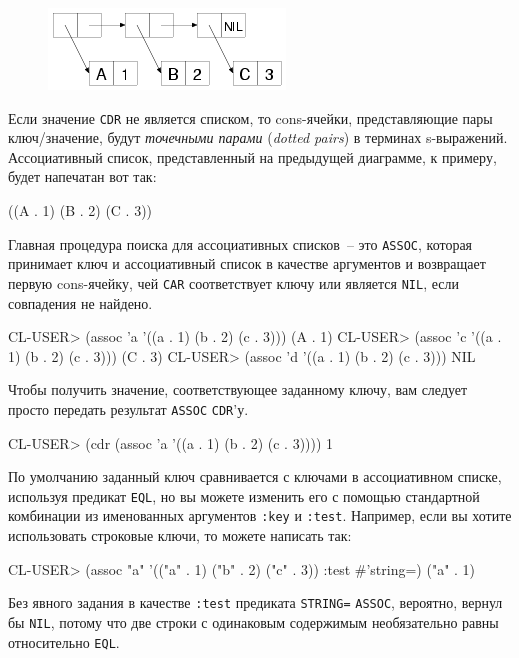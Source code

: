 \begin{figure}[h]
  \centering
  \includegraphics[scale=0.6]{images/alist-abc-123.png}
\end{figure}

Если значение \lstinline{CDR} не является списком, то cons-ячейки, представляющие пары ключ/значение,
будут \textit{точечными парами} (\textit{dotted pairs}) в терминах s-выражений. Ассоциативный
список, представленный на предыдущей диаграмме, к примеру, будет напечатан вот так:

\begin{myverb}
  ((A . 1) (B . 2) (C . 3))
\end{myverb}

Главная процедура поиска для ассоциативных списков~-- это \lstinline{ASSOC}, которая принимает
ключ и ассоциативный список в качестве аргументов и возвращает первую cons-ячейку, чей
\lstinline{CAR} соответствует ключу или является \lstinline{NIL}, если совпадения не найдено.
  
\begin{myverb}
  CL-USER> (assoc 'a '((a . 1) (b . 2) (c . 3)))
  (A . 1)
  CL-USER> (assoc 'c '((a . 1) (b . 2) (c . 3)))
  (C . 3)
  CL-USER> (assoc 'd '((a . 1) (b . 2) (c . 3)))
  NIL
\end{myverb}

Чтобы получить значение, соответствующее заданному ключу, вам следует просто передать
результат \lstinline{ASSOC} \lstinline{СDR}'у.
  
\begin{myverb}
  CL-USER> (cdr (assoc 'a '((a . 1) (b . 2) (c . 3))))
  1
\end{myverb}

По умолчанию заданный ключ сравнивается с ключами в ассоциативном списке, используя
предикат \lstinline{EQL}, но вы можете изменить его с помощью стандартной комбинации из
именованных аргументов \lstinline{:key} и \lstinline{:test}. Например, если вы хотите использовать
строковые ключи, то можете написать так:
  
\begin{myverb}
  CL-USER> (assoc "a" '(("a" . 1) ("b" . 2) ("c" . 3)) :test #'string=)
  ("a" . 1)
\end{myverb}

Без явного задания в качестве \lstinline{:test} предиката \lstinline{STRING=} \lstinline{ASSOC}, вероятно,
вернул бы \lstinline{NIL}, потому что две строки с одинаковым содержимым необязательно равны
относительно \lstinline{EQL}.

